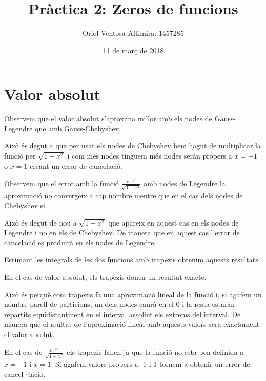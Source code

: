 \documentclass{article}
\title{Pràctica 2: Zeros de funcions}
\author{Oriol Ventosa Altimira: 1457285}
\date{11 de març de 2018}
\begin{document}
	\maketitle
	
	\newpage

	\section{Valor absolut}
	
	Observem que el valor absolut s'aproxima millor amb els nodes de Gauss-Legendre que amb Gauss-Chebyshev. 
	
	Això és degut a que per usar els nodes de Chebyshev hem hagut de multiplicar la funció per $\sqrt{1-x^2}$ i com més nodes tinguem més nodes seràn propers a $x=-1$ o $x=1$ creant un error de cancelació.
	
	Observem que el error amb la funció $\frac{e^{-x^2}}{\sqrt{1-x^2}}$ amb nodes de Legendre la aproximació no convergeix a cap nombre mentre que en el cas dels nodes de Chebyshev sí.
	
	Això és degut de nou a $\sqrt{1-x^2}$ que apareix en aquest cas en els nodes de Legendre i no en els de Chebyshev. De manera que en aquest cas l'error de cancelació es produirà en els nodes de Legendre.

	Estimant les integrals de les dos funcions amb trapezis obtenim aquests resultats:
	
	En el cas de valor absolut, els trapezis donen un resultat exacte. 
	
	Això és perquè com trapezis fa una aproximació lineal de la funció i, si agafem un nombre parell de particions, un dels nodes caurà en el 0 i la resta estaràn repartits equidistantment en el interval assolint els extrems del interval. De manera que el reultat de l'aproximació lineal amb aquests valors serà exactament el valor absolut.
	
	En el cas de $\frac{e^{-x^2}}{\sqrt{1-x^2}}$ els trapezis fallen ja que la funció no esta ben definida a $x=-1$ i $x=1$. Si agafem valors propers a -1 i 1 tornem a obtenir un error de cancel·lació.
	
\end{document}
